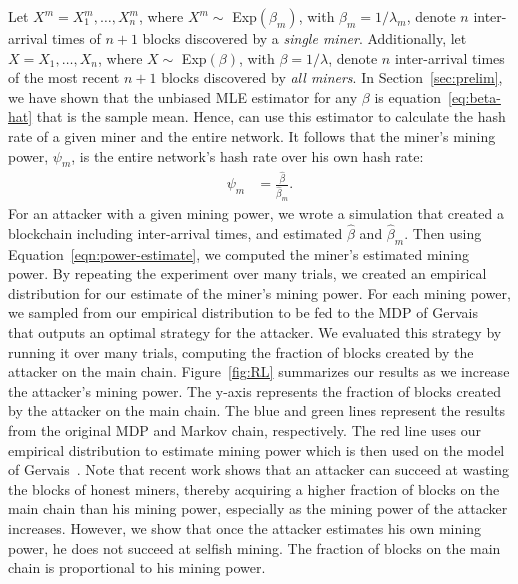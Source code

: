 Let $X^m = X_1^m, \dots, X_{n}^m$, where $X^m \sim$ Exp$(\beta_m)$, with $\beta_m = 1/\lambda_m$, denote $n$ inter-arrival times of $n+1$ blocks discovered by a {\em single miner}. Additionally, let $X = X_1, \dots, X_{n}$, where $X \sim$ Exp$(\beta)$, with $\beta = 1/\lambda$, denote $n$ inter-arrival times of the most recent $n+1$ blocks discovered by {\em all miners}.
In Section~\ref{sec:prelim}, we have shown that the unbiased MLE estimator for any $\beta$ is equation~\ref{eq:beta-hat} that is the sample mean. Hence, can use this estimator to calculate the hash rate of a given miner and the entire network. It follows that the miner's mining power, $\psi_m$, is the entire network's hash rate over his own hash rate:
\begin{align}
\psi_m &= \frac{\hat{\beta}}{\hat{\beta}_m}.\label{eqn:power-estimate}
\end{align} 
 For an attacker with a given mining power, we wrote a simulation that created a blockchain including inter-arrival times, and estimated $\hat{\beta}$ and $\hat{\beta}_m$. Then using Equation~\ref{eqn:power-estimate}, we computed the miner's estimated mining power. By repeating the experiment over many trials, we created an empirical distribution for our estimate of the miner's mining power. For each mining power, we sampled from our empirical distribution to be fed to the MDP of Gervais~\cite{Gervais:2016} that outputs an optimal strategy for the attacker. We evaluated this strategy by running it over many trials, computing the fraction of blocks created by the attacker on the main chain. Figure~\ref{fig:RL} summarizes our results as we increase the attacker's mining power. The y-axis represents the fraction of blocks created by the attacker on the main chain. The blue and green lines represent the results from the original MDP and Markov chain, respectively. The red line uses our empirical distribution to estimate mining power which is then used on the model of Gervais~\cite{Gervais:2016}. Note that recent work shows that an attacker can succeed at wasting the blocks of honest miners, thereby acquiring a higher fraction of blocks on the main chain than his mining power, especially as the mining power of the attacker increases. However, we show that once the attacker estimates his own mining power, he does not succeed at selfish mining. The fraction of blocks on the main chain is proportional to his mining power.

